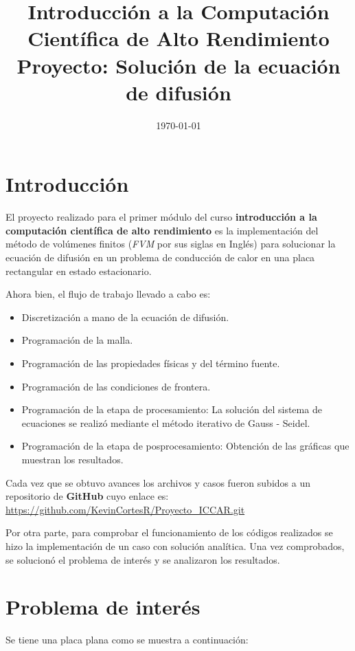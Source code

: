 \documentclass[article,latterpaper]{IEEEtran}
\title{Introducción a la Computación Científica de Alto Rendimiento\\Proyecto: Solución de la ecuación de difusión}
\author{
\IEEEauthorblockN{Kevin Steven Cortés Rincón\IEEEauthorrefmark{1}}
\IEEEauthorblockA{\textit{kcortes@unal.edu.co}\\\IEEEauthorrefmark{1}Departamento de ingeniería mecánica y mecatrónica, Universidad Nacional de Colombia, Sede Bogotá}
}
\date{\today}
\begin{document}
\maketitle

\section{Introducción}
El proyecto realizado para el primer módulo del curso \textbf{introducción a la computación científica de alto rendimiento} es la implementación del método de volúmenes finitos (\textit{FVM} por sus siglas en Inglés) para solucionar la ecuación de difusión en un problema de conducción de calor en una placa rectangular en estado estacionario.

Ahora bien, el flujo de trabajo llevado a cabo es:

\begin{itemize}
	\item Discretización a mano de la ecuación de difusión.
	\item Programación de la malla.
	\item Programación de las propiedades físicas y del término fuente.
	\item Programación de las condiciones de frontera.
	\item Programación de la etapa de procesamiento: La solución del sistema de ecuaciones se realizó mediante el método iterativo de Gauss - Seidel.
	\item Programación de la etapa de posprocesamiento: Obtención de las gráficas que muestran los resultados.
\end{itemize}

Cada vez que se obtuvo avances los archivos y casos fueron subidos a un repositorio de \textbf{GitHub} cuyo enlace es: \url{https://github.com/KevinCortesR/Proyecto_ICCAR.git}

\vspace{1.5 cm}

Por otra parte, para comprobar el funcionamiento de los códigos realizados se hizo la implementación de un caso con solución analítica. Una vez comprobados, se solucionó el problema de interés y se analizaron los resultados.

\section{Problema de interés}
Se tiene una placa plana como se muestra a continuación:
\end{document}
